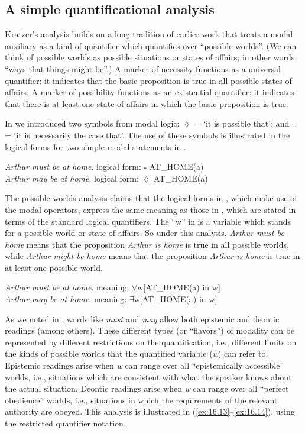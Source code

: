 \subsection{A simple quantificational analysis}\label{sec:16.3.1}

Kratzer’s analysis builds on a long tradition of earlier work that treats a modal auxiliary as a kind of quantifier which quantifies over “possible worlds”. (We can think of possible worlds as possible situations or states of affairs; in other words, “ways that things might be”.) A marker of necessity functions as a universal quantifier: it indicates that the basic proposition is true in all possible states of affairs. A marker of possibility functions as an existential quantifier: it indicates that there is at least one state of affairs in which the basic proposition is true.



In  we introduced two symbols from modal logic: ${\lozenge}$ = ‘it is possible that’; and ${\square}$ = ‘it is necessarily the case that’. The use of these symbols is illustrated in the logical forms for two simple modal statements in .


\ea \label{ex:16.11}
\ea  \textit{Arthur must be at home}. \hfill logical form: ${\square}$ AT\_HOME(a)\\
\ex \textit{Arthur may be at home}.                 \hfill logical form: ${\lozenge}$ AT\_HOME(a)
                       \z
\z


The possible worlds analysis claims that the logical forms in , which make use of the modal operators, express the same meaning as those in , which are stated in terms of the standard logical quantifiers. The “w” in  is a variable which stands for a possible world or state of affairs. So under this analysis, \textit{Arthur must be home} means that the proposition \textit{Arthur is home} is true in all possible worlds, while \textit{Arthur might be home} means that the proposition \textit{Arthur is home} is true in at least one possible world.


\ea \label{ex:16.12}
\ea  \textit{Arthur must be at home}. \hfill meaning: ${\forall}$w[AT\_HOME(a) in w]\\
\ex \textit{Arthur may be at home}.                 \hfill meaning: ${\exists}$w[AT\_HOME(a) in w]
                       \z
\z


As we noted in , words like \textit{must} and \textit{may} allow both epistemic and deontic readings (among others). These different types (or “flavors”) of modality can be represented by different restrictions on the quantification, i.e., different limits on the kinds of possible worlds that the quantified variable (\textit{w}) can refer to. Epistemic readings arise when \textit{w} can range over all “epistemically accessible” worlds, i.e., situations which are consistent with what the speaker knows about the actual situation. Deontic readings arise when \textit{w} can range over all “perfect obedience” worlds, i.e., situations in which the requirements of the relevant authority are obeyed. This analysis is illustrated in (\ref{ex:16.13}--\ref{ex:16.14}), using the restricted quantifier notation.


